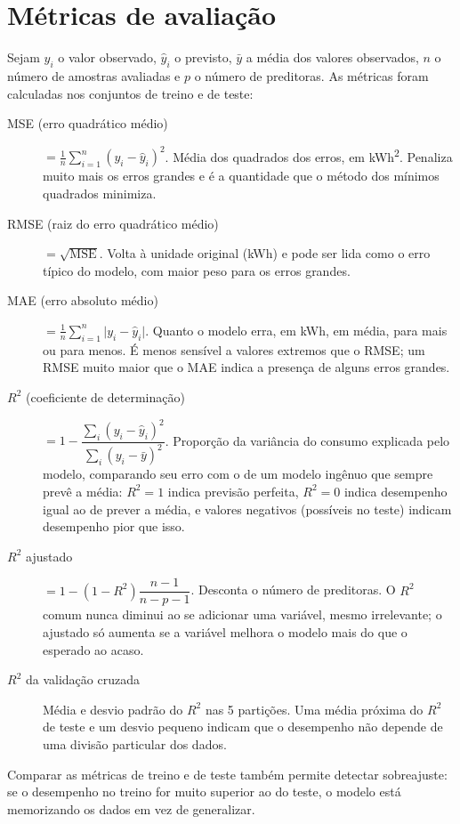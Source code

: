 \section{Métricas de avaliação}

Sejam $y_i$ o valor observado, $\hat{y}_i$ o previsto, $\bar{y}$ a média dos
valores observados, $n$ o número de amostras avaliadas e $p$ o número de
preditoras. As métricas foram calculadas nos conjuntos de treino e de teste:

\begin{description}
  \item[MSE (erro quadrático médio)] $= \frac{1}{n}\sum_{i=1}^{n}(y_i - \hat{y}_i)^2$.
  Média dos quadrados dos erros, em kWh\textsuperscript{2}. Penaliza muito
  mais os erros grandes e é a quantidade que o método dos mínimos quadrados
  minimiza.

  \item[RMSE (raiz do erro quadrático médio)] $= \sqrt{\mathrm{MSE}}$.
  Volta à unidade original (kWh) e pode ser lida como o erro típico do
  modelo, com maior peso para os erros grandes.

  \item[MAE (erro absoluto médio)] $= \frac{1}{n}\sum_{i=1}^{n}\lvert y_i - \hat{y}_i\rvert$.
  Quanto o modelo erra, em kWh, em média, para mais ou para menos. É menos
  sensível a valores extremos que o RMSE; um RMSE muito maior que o MAE indica
  a presença de alguns erros grandes.

  \item[$R^2$ (coeficiente de determinação)] $= 1 - \dfrac{\sum_{i}(y_i - \hat{y}_i)^2}{\sum_{i}(y_i - \bar{y})^2}$.
  Proporção da variância do consumo explicada pelo modelo, comparando seu erro
  com o de um modelo ingênuo que sempre prevê a média: $R^2 = 1$ indica
  previsão perfeita, $R^2 = 0$ indica desempenho igual ao de prever a média, e
  valores negativos (possíveis no teste) indicam desempenho pior que isso.

  \item[$R^2$ ajustado] $= 1 - (1 - R^2)\dfrac{n - 1}{n - p - 1}$.
  Desconta o número de preditoras. O $R^2$ comum nunca diminui ao se adicionar
  uma variável, mesmo irrelevante; o ajustado só aumenta se a variável melhora
  o modelo mais do que o esperado ao acaso.

  \item[$R^2$ da validação cruzada] Média e desvio padrão do $R^2$ nas 5
  partições. Uma média próxima do $R^2$ de teste e um desvio pequeno indicam
  que o desempenho não depende de uma divisão particular dos dados.
\end{description}

Comparar as métricas de treino e de teste também permite detectar
sobreajuste: se o desempenho no treino for muito superior ao do teste, o
modelo está memorizando os dados em vez de generalizar.